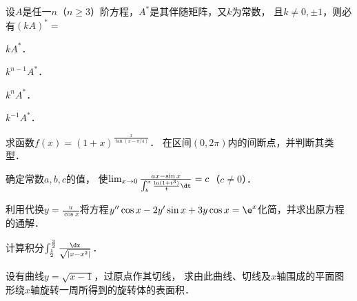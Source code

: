 \documentclass[plain,noanswer,medmath]{../../template/jnuexam}
\begin{document}
\begin{problem}
设$A$是任一$n$（$n \ge 3$）阶方程，$A^*$是其伴随矩阵，又$k$为常数，
且$k \ne 0, \pm 1$，则必有$(kA)^* =$\pickout{}
\begin{abcd}
\item $kA^*$．
\item $k^{n - 1}A^*$．
\item $k^n A^*$．
\item $k^{-1}A^*$．
\end{abcd}
\end{problem}



\begin{problem}
求函数$f(x) = \left(1 + x \right)^{\frac{x}{\tan(x - \pi /4)}}$．
在区间$\left(0,2\pi \right)$内的间断点，并判断其类型．
\end{problem}



\begin{problem}
确定常数$a,b,c$的值，
使$\lim_{x \to 0}\frac{ax-\sin x}{\int_b^x\frac{\ln(1 + t^3)}{t}\dt} = c$（$c \ne 0$）．
\end{problem}



\begin{problem}
利用代换$y = \frac{u}{\cos x}$将方程$y''\cos x - 2y'\sin x + 3y\cos x = \e^x$化简，并求出原方程的通解．
\end{problem}



\begin{problem}
计算积分$\int_{\frac{1}{2}}^{\frac{3}{2}} \frac{\dx}{\sqrt{\left| x - x^2 \right|}}$．
\end{problem}









\begin{problem}
设有曲线$y = \sqrt{x - 1}$，过原点作其切线，
求由此曲线、切线及$x$轴围成的平面图形绕$x$轴旋转一周所得到的旋转体的表面积．
\end{problem}


\end{document}
